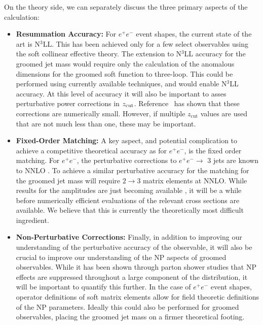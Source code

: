 \documentclass[11pt,letterpaper]{article}
\newcommand{\zcut}{z_{\rm cut}}
\begin{document}
On the theory side, we can separately discuss the three primary aspects of the calculation:
%
\begin{itemize}
\item {\bf Resummation Accuracy:} For $e^+e^-$ event shapes, the current state of the art is N$^3$LL.
%
This has been achieved only for a few select observables using the soft collinear effective theory.
%
The extension  to N$^3$LL accuracy for the groomed jet mass would require only the calculation of the anomalous dimensions for the groomed soft function to three-loop.
%
This could be performed using currently available techniques, and would enable N$^3$LL accuracy.
%
At this level of accuracy it will also be important to asses perturbative power corrections in $\zcut$.
%
Reference~\cite{Marzani:2017kqd,Marzani:2017mva} has shown that these corrections are numerically small.
%
However, if multiple $z_\text{cut}$ values are used that are not much less than one, these may be important.
%
\item {\bf Fixed-Order Matching:} A key aspect, and potential complication to achieve a competitive theoretical accuracy as for $e^+e^-$, is the fixed order matching.
%
For $e^+e^-$, the perturbative corrections to $e^+e^- \to$ 3 jets are known to NNLO \cite{GehrmannDeRidder:2007hr,Gehrmann-DeRidder:2007nzq,Weinzierl:2008iv,Weinzierl:2009ms}.
%
To achieve a similar perturbative accuracy for the matching for the groomed jet mass will require $2\to 3$ matrix elements at NNLO.
%
While results for the amplitudes are just becoming available \cite{Gehrmann:2015bfy,Dunbar:2016aux,Badger:2013yda,Badger:2017jhb,Abreu:2017hqn}, it will be a while before numerically efficient evaluations of the relevant cross sections are available.
%
We believe that this is currently the theoretically most difficult ingredient.
%
\item {\bf Non-Perturbative Corrections:} Finally, in addition to improving our understanding of the perturbative accuracy of the observable, it will also be crucial to improve our understanding of the NP aspects of groomed observables.
%
While it has been shown through parton shower studies that NP effects are suppressed throughout a large component of the distribution, it will be important to quantify this further.
%
In the case of $e^+e^-$ event shapes, operator definitions of soft matrix elements allow for field theoretic definitions of the NP parameters.
%
Ideally this could also be performed for groomed observables, placing the groomed jet mass on a firmer theoretical footing.
%
\end{itemize}
\end{document}
